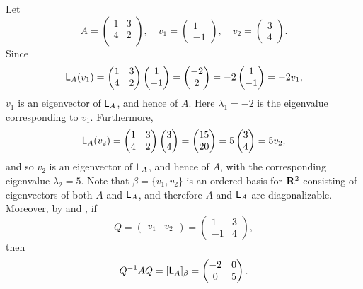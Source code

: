 \begin{example} \label{example 5.1.1}
Let
\[
    A = \begin{pmatrix} 1 & 3 \\ 4 & 2 \\ \end{pmatrix},
    \quad v_1 = \begin{pmatrix} 1 \\ -1 \end{pmatrix},
    \quad v_2 = \begin{pmatrix} 3 \\ 4 \end{pmatrix}.
\]
Since
\[
    \textsf{L}_A (v_1) = \begin{pmatrix} 1 & 3 \\ 4 & 2 \\ \end{pmatrix} \begin{pmatrix} 1 \\ -1 \end{pmatrix} = \begin{pmatrix} -2 \\ 2 \end{pmatrix} = -2 \begin{pmatrix} 1 \\ -1 \end{pmatrix} = -2 v_1,
\]
\(v_1\) is an eigenvector of \(\textsf{L}_A\), and hence of \(A\).
Here \(\lambda_1 = -2\) is the eigenvalue corresponding to \(v_1\).
Furthermore,
\[
    \textsf{L}_A (v_2) = \begin{pmatrix} 1 & 3 \\ 4 & 2 \\ \end{pmatrix} \begin{pmatrix} 3 \\ 4 \end{pmatrix} = \begin{pmatrix} 15 \\ 20 \end{pmatrix} = 5 \begin{pmatrix} 3 \\ 4 \end{pmatrix} = 5 v_2,
\]
and so \(v_2\) is an eigenvector of \(\textsf{L}_A\), and hence of \(A\), with the corresponding eigenvalue \(\lambda_2 = 5\).
Note that \(\beta = \{ v_1, v_2 \}\) is an ordered basis for \(\mathbf{R}^2\) consisting of eigenvectors of both \(A\) and \(\textsf{L}_A\), and therefore \(A\) and \(\textsf{L}_A\) are diagonalizable.
Moreover, by  and , if
\[
    Q = \begin{pmatrix} v_1 & v_2 \end{pmatrix} = \begin{pmatrix} 1 & 3 \\ -1 & 4 \end{pmatrix},
\]
then
\[
    Q^{-1} A Q = [\textsf{L}_A]_{\beta} = \begin{pmatrix} -2 & 0 \\ 0 & 5 \end{pmatrix}.
\]
\end{example}

